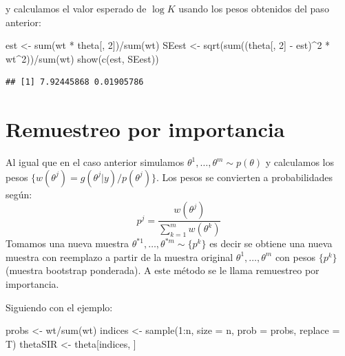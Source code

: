 \documentclass[
  12pt,
]{book}
\newenvironment{Shaded}{\begin{snugshade}}{\end{snugshade}}
\newcommand{\AttributeTok}[1]{\textcolor[rgb]{0.77,0.63,0.00}{#1}}
\newcommand{\DecValTok}[1]{\textcolor[rgb]{0.00,0.00,0.81}{#1}}
\newcommand{\FunctionTok}[1]{\textcolor[rgb]{0.00,0.00,0.00}{#1}}
\newcommand{\NormalTok}[1]{#1}
\newcommand{\OtherTok}[1]{\textcolor[rgb]{0.56,0.35,0.01}{#1}}
\newcommand{\SpecialCharTok}[1]{\textcolor[rgb]{0.00,0.00,0.00}{#1}}
\begin{document}
y calculamos el valor esperado de \(\log K\) usando los pesos obtenidos
del paso anterior:

\begin{Shaded}
\begin{Highlighting}[]
\NormalTok{est }\OtherTok{\textless{}{-}} \FunctionTok{sum}\NormalTok{(wt }\SpecialCharTok{*}\NormalTok{ theta[, }\DecValTok{2}\NormalTok{])}\SpecialCharTok{/}\FunctionTok{sum}\NormalTok{(wt)}
\NormalTok{SEest }\OtherTok{\textless{}{-}} \FunctionTok{sqrt}\NormalTok{(}\FunctionTok{sum}\NormalTok{((theta[, }\DecValTok{2}\NormalTok{] }\SpecialCharTok{{-}}\NormalTok{ est)}\SpecialCharTok{\^{}}\DecValTok{2} \SpecialCharTok{*}\NormalTok{ wt}\SpecialCharTok{\^{}}\DecValTok{2}\NormalTok{))}\SpecialCharTok{/}\FunctionTok{sum}\NormalTok{(wt)}
\FunctionTok{show}\NormalTok{(}\FunctionTok{c}\NormalTok{(est, SEest))}
\end{Highlighting}
\end{Shaded}

\begin{verbatim}
## [1] 7.92445868 0.01905786
\end{verbatim}

\hypertarget{remuestreo-por-importancia}{%
\section{Remuestreo por importancia}\label{remuestreo-por-importancia}}

Al igual que en el caso anterior simulamos
\(\theta^1,\ldots,\theta^m\sim p(\theta)\) y calculamos los pesos
\(\{w(\theta^j)=g(\theta^j|y)/p(\theta^j)\}\). Los pesos se convierten a
probabilidades según:
\[p^j=\frac{w(\theta^j)}{\sum_{k=1}^mw(\theta^k)}\] Tomamos una nueva
muestra \(\theta^{*1},\ldots,\theta^{*m}\sim \{p^k\}\) es decir se
obtiene una nueva muestra con reemplazo a partir de la muestra original
\(\theta^1,\ldots,\theta^m\) con pesos \(\{p^k\}\) (muestra bootstrap
ponderada). A este método se le llama remuestreo por importancia.

Siguiendo con el ejemplo:

\begin{Shaded}
\begin{Highlighting}[]
\NormalTok{probs }\OtherTok{\textless{}{-}}\NormalTok{ wt}\SpecialCharTok{/}\FunctionTok{sum}\NormalTok{(wt)}
\NormalTok{indices }\OtherTok{\textless{}{-}} \FunctionTok{sample}\NormalTok{(}\DecValTok{1}\SpecialCharTok{:}\NormalTok{n, }\AttributeTok{size =}\NormalTok{ n, }\AttributeTok{prob =}\NormalTok{ probs, }\AttributeTok{replace =}\NormalTok{ T)}
\NormalTok{thetaSIR }\OtherTok{\textless{}{-}}\NormalTok{ theta[indices, ]}
\end{Highlighting}
\end{Shaded}
\end{document}
